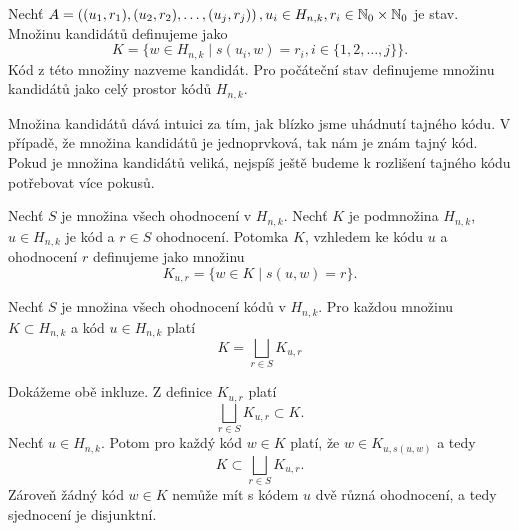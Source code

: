 \begin{definice}\label{kandidat}
  Nechť $A = \left((u_1, r_1), (u_2,r_2), \dots, (u_j,r_j)\right), u_i \in H_{n,k}, r_i \in \mathbb{N} _0 \times \mathbb{N} _0$ je stav. Množinu kandidátů definujeme jako
  \[K = \{w \in H_{n,k} \mid s(u_i,w) = r_i,  i \in \{1,2,\dots ,j\} \}.\]
  Kód z této množiny nazveme kandidát. 
  Pro počáteční stav definujeme množinu kandidátů jako celý prostor kódů $H_{n,k}$.

\end{definice}
Množina kandidátů dává intuici za tím, jak blízko jsme uhádnutí tajného kódu. V případě, že množina kandidátů je jednoprvková, tak nám je znám tajný kód. Pokud je množina kandidátů veliká, nejspíš ještě budeme k rozlišení tajného kódu potřebovat více pokusů.


\begin{definice}\label{lemmasjednocenipotomku}
  Nechť $S$ je množina všech ohodnocení v $H_{n,k}$. Nechť $K$ je podmnožina $H_{n,k}$, $ u \in H_{n,k}$ je kód a $r \in S$ ohodnocení. Potomka $K$, vzhledem ke kódu $u$ a ohodnocení $r$ definujeme jako množinu 
  \[K_{u,r} = \{w \in K \mid s(u,w) = r\}.\] 
\end{definice}

\begin{lemma}
    Nechť $S$ je množina všech ohodnocení kódů v $H_{n,k}$. Pro každou množinu $K \subset H_{n,k}$ a kód $u \in H_{n,k}$ platí
    \[K = \bigsqcup_{r\in S} K_{u,r}\]
\end{lemma}
\begin{dukaz}
    Dokážeme obě inkluze. Z definice $K_{u,r}$ platí 
    \[\bigsqcup_{r\in S} K_{u,r} \subset K.\] 
    Nechť $u \in H_{n,k}$. Potom pro každý kód $w \in K$ platí, že $w \in K_{u, s(u,w)}$ a tedy 
    \[K \subset \bigsqcup_{r\in S} K_{u,r}.\] 
    Zároveň žádný kód $w \in K$ nemůže mít s kódem $u$ dvě různá ohodnocení, a tedy sjednocení je disjunktní. 
\end{dukaz}

